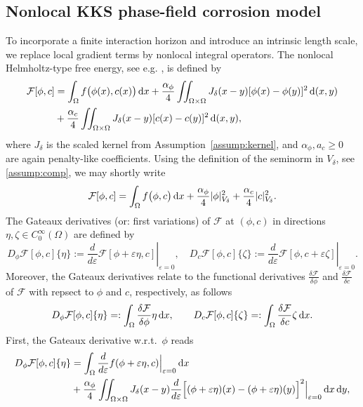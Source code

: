 \documentclass[]{article}
\newcommand{\eps}{\varepsilon}
\newcommand{\dx}{\,\textup{d}x}
\newcommand{\dy}{\,\textup{d}y}
\newcommand{\dxy}{\,\textup{d}(x,y)}
\DeclarePairedDelimiter{\abs}{\lvert}{\rvert}
\begin{document}
\subsection{Nonlocal KKS phase-field corrosion model}
\label{subsec:nonlocal}

To incorporate a finite interaction horizon and introduce an intrinsic length scale, we replace local gradient terms by nonlocal integral operators. The nonlocal Helmholtz-type free energy, see e.g. \cite{fritz2019unsteady,gal2017nonlocal}, is defined by
\[
\begin{aligned}
	\mathcal{F}[\phi,c]
	&=
	\int_{\Omega} f\bigl(\phi(x),c(x)\bigr)\dx
	+
	\frac{\alpha_{\phi}}{4}
	\iint_{\Omega \times \Omega} J_{\delta}(x-y)[\phi(x)-\phi(y)]^2\dxy
	\\
	&+
	\frac{\alpha_{c}}{4}
	\iint_{\Omega \times \Omega} J_{\delta}(x-y)[c(x)-c(y)]^2\dxy,
\end{aligned}
\]
where \(J_{\delta}\) is the scaled kernel from Assumption~\ref{assump:kernel}, and \(\alpha_{\phi},a_c\geq 0\) are again penalty-like coefficients. Using the definition of the seminorm in $V_\delta$, see \eqref{assump:comp}, we may shortly write
\[
\mathcal{F}[\phi,c]
=
\int_{\Omega} f\bigl(\phi,c\bigr)\dx
+
\frac{\alpha_{\phi}}{4}
\abs{\phi}_{V_\delta}^2
+
\frac{\alpha_{c}}{4}
\abs{c}_{V_\delta}^2.
\]
The Gateaux derivatives (or: first variations) of \(\mathcal{F}\) at \((\phi,c)\) in directions \(\eta,\zeta\in C_0^\infty(\Omega)\) are defined by
\[
D_{\phi}\mathcal{F}[\phi,c]\{\eta\}
:=\left.\frac{d}{d\eps}\mathcal{F}[\phi+\eps\eta,c]\right|_{\eps=0},
\quad
D_{c}\mathcal{F}[\phi,c]\{\zeta\}
:=\left.\frac{d}{d\eps}\mathcal{F}[\phi,c+\eps\zeta]\right|_{\eps=0}.
\]
Moreover, the Gateaux derivatives relate to the functional derivatives $\frac{\delta\mathcal{F}}{\delta\phi}$ and $\frac{\delta\mathcal{F}}{\delta c}$ of $\mathcal{F}$ with repsect to $\phi$ and $c$, respectively, as follows
$$D_{\phi}\mathcal{F}[\phi,c]\{\eta\}=:\int_\Omega \frac{\delta\mathcal{F}}{\delta\phi} \eta  \dx, \qquad D_{c}\mathcal{F}[\phi,c]\{\zeta\}=:\int_\Omega \frac{\delta\mathcal{F}}{\delta c} \zeta  \dx.$$
First, the Gateaux derivative w.r.t.\ \(\phi\) reads
\[
\begin{aligned}
	D_{\phi}\mathcal{F}[\phi,c]\{\eta\}
	&=\int_{\Omega}\frac{d}{d\eps} f(\phi+\eps\eta,c)\Big|_{\eps=0}\dx \\
	&+\frac{\alpha_{\phi}}{4}
	\iint_{\Omega\times\Omega} J_{\delta}(x-y)\frac{d}{d\eps}\Bigl[(\phi+\eps\eta)(x)-(\phi+\eps\eta)(y)\Bigr]^2\Big|_{\eps=0}
	\dx\dy,
\end{aligned}
\]
\end{document}
